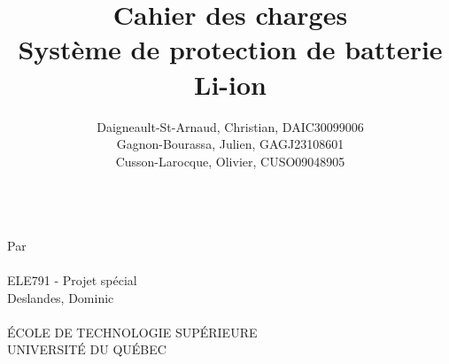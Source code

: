 
\title{
	\textbf{Cahier des charges} \\
	\vspace{2cm}
	Système de protection de batterie Li-ion	
	}
\author{
	Daigneault-St-Arnaud, Christian, DAIC30099006 \\
	Gagnon-Bourassa, Julien, GAGJ23108601 \\
	Cusson-Larocque, Olivier, CUSO09048905	
}
\newcommand{\cours}{ELE791 - Projet spécial }
\newcommand{\prof}{Deslandes, Dominic}



\makeatletter
\begin{titlepage}

	
	\thispagestyle{empty}
	\centering
	{\Huge \@title}\\ 
	\vspace{2cm}
	{\large Par \\
		\vspace{0.5cm}
		\@author \\
		\vspace{2cm}
		\cours \\
		\vspace{0.5cm}
		\prof \\
		\vspace{3.0cm}
		\@date \\
		\vspace{3.0cm}
		\'{E}COLE DE TECHNOLOGIE SUP\'{E}RIEURE \\
		UNIVERSIT\'{E} DU QUÉBEC
	}
\end{titlepage}
\makeatother




